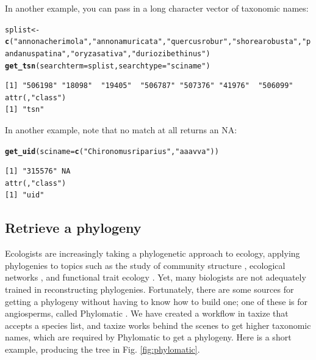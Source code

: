 \documentclass[10pt,a4paper,twocolumn]{article}
\makeatletter
\newcommand{\hlfunctioncall}[1]{\textcolor[rgb]{0.501960784313725,0,0.329411764705882}{\textbf{#1}}}%
\newcommand{\hlstring}[1]{\textcolor[rgb]{0.6,0.6,1}{#1}}%
\newenvironment{kframe}{%
 \def\at@end@of@kframe{}%
 \ifinner\ifhmode%
  \def\at@end@of@kframe{\end{minipage}}%
  \begin{minipage}{\columnwidth}%
 \fi\fi%
 \def\FrameCommand##1{\hskip\@totalleftmargin \hskip-\fboxsep
 \colorbox{shadecolor}{##1}\hskip-\fboxsep
     \hskip-\linewidth \hskip-\@totalleftmargin \hskip\columnwidth}%
 \MakeFramed {\advance\hsize-\width
   \@totalleftmargin\z@ \linewidth\hsize
   \@setminipage}}%
 {\par\unskip\endMakeFramed%
 \at@end@of@kframe}
\newenvironment{knitrout}{}{} %
\makeatother
\begin{document}
In another example, you can pass in a long character vector of taxonomic names:

\begin{knitrout}
\begin{scriptsize}
\color{fgcolor}\begin{kframe}
\begin{alltt}
splist <- \hlfunctioncall{c}(\hlstring{"annona cherimola"}, \hlstring{"annona muricata"}, \newline \hlstring{"quercus robur"}, \hlstring{"shorea robusta"}, \hlstring{"pandanus patina"}, \newline \hlstring{"oryza sativa"}, \hlstring{"durio zibethinus"})
\hlfunctioncall{get_tsn}(searchterm = splist, searchtype = \hlstring{"sciname"})
\end{alltt}
\begin{verbatim}
[1] "506198" "18098"  "19405"  "506787" "507376" "41976"  "506099"
attr(,"class")
[1] "tsn"
\end{verbatim}
\end{kframe}
\end{scriptsize}
\end{knitrout}


In another example, note that no match at all returns an NA:

\begin{knitrout}
\begin{scriptsize}
\color{fgcolor}\begin{kframe}
\begin{alltt}
\hlfunctioncall{get_uid}(sciname = \hlfunctioncall{c}(\hlstring{"Chironomus riparius"}, \hlstring{"aaa vva"}))
\end{alltt}
\begin{verbatim}
[1] "315576" NA      
attr(,"class")
[1] "uid"
\end{verbatim}
\end{kframe}
\end{scriptsize}
\end{knitrout}


\subsection*{Retrieve a phylogeny}
Ecologists are increasingly taking a phylogenetic approach to ecology, applying phylogenies to topics such as the study of community structure \cite{webb2002phylogenies}, ecological networks \cite{rafferty2013phylogenetic}, and functional trait ecology \cite{poff2006functional}. Yet, many biologists are not adequately trained in reconstructing phylogenies. Fortunately, there are some sources for getting a phylogeny without having to know how to build one; one of these is for angiosperms, called Phylomatic \cite{webb2005}. We have created a workflow in taxize that accepts a species list, and taxize works behind the scenes to get higher taxonomic names, which are required by Phylomatic to get a phylogeny. Here is a short example, producing the tree in Fig. \ref{fig:phylomatic}.
\end{document}
